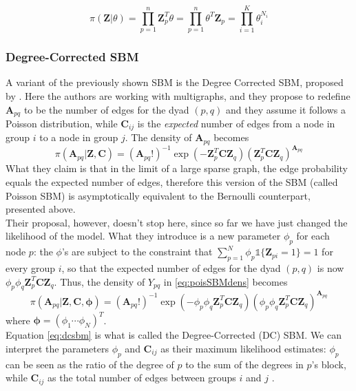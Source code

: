\begin{equation}
    \pi(\mathbf{Z}|\theta) = \prod_{p=1}^n \mathbf{Z}_p^T \theta = \prod_{p=1}^n \theta^T \mathbf{Z}_p = \prod_{i=1}^K \theta^{N_i}_i
\end{equation}

\subsubsection{Degree-Corrected SBM}
A variant of the previously shown SBM is the Degree Corrected SBM, proposed by \textcite{karrer2011dcsbm}. Here the authors are working with multigraphs, and they propose to redefine $\mathbf{A}_{pq}$ to be the number of edges for the dyad $(p,q)$ and they assume it follows a Poisson distribution, while $\mathbf{C}_{ij}$ is the \textit{expected} number of edges from a node in group $i$ to a node in group $j$. The density of $\mathbf{A}_{pq}$ becomes
\begin{equation}\label{eq:poisSBMdens}
    \pi(\mathbf{A}_{pq}|\mathbf{Z,C}) = (\mathbf{A}_{pq}!)^{-1} \exp \left( -\mathbf{Z}^T_p \mathbf{C} \mathbf{Z}_q \right) \left( \mathbf{Z}^T_p \mathbf{C} \mathbf{Z}_q \right)^{\mathbf{A}_{pq}}
\end{equation}
What they claim is that in the limit of a large sparse graph, the edge probability equals the expected number of edges, therefore this version of the SBM (called Poisson SBM) is asymptotically equivalent to the Bernoulli counterpart, presented above.\\
Their proposal, however, doesn't stop here, since so far we have just changed the likelihood of the model. What they introduce is a new parameter $\phi_p$ for each node $p$: the $\phi$'s are subject to the constraint that $\sum_{p=1}^N \phi_p \mathbb{1}\{\mathbf{Z}_{pi} = 1\} = 1$ for every group $i$, so that the expected number of edges for the dyad $(p,q)$ is now $\phi_p \phi_q \mathbf{Z}^T_p \mathbf{C} \mathbf{Z}_q$. Thus, the density of $Y_{pq}$ in \ref{eq:poisSBMdens} becomes
\begin{equation}\label{eq:dcsbm}
    \pi(\mathbf{A}_{pq}|\mathbf{Z,C,\phi}) = (\mathbf{A}_{pq}!)^{-1} \exp \left( -\phi_p \phi_q \mathbf{Z}^T_p \mathbf{C} \mathbf{Z}_q \right) \left(\phi_p \phi_q \mathbf{Z}^T_p \mathbf{C} \mathbf{Z}_q \right)^{\mathbf{A}_{pq}}
\end{equation}
where $\mathbf{\phi} = (\phi_1 \cdots \phi_N)^T$.\\
Equation \ref{eq:dcsbm} is what is called the Degree-Corrected (DC) SBM. We can interpret the parameters $\phi_p$ and $\mathbf{C}_{ij}$ as their maximum likelihood estimates: $\phi_p$ can be seen as the ratio of the degree of $p$ to the sum of the degrees in $p$'s block, while $\mathbf{C}_{ij}$ as the total number of edges between groups $i$ and $j$ \cite{lee2019review}.
